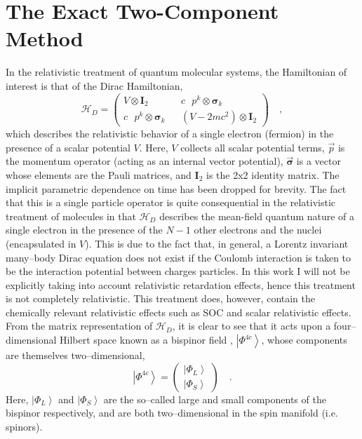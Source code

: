\documentclass[12pt]{article}
\newcommand{\ket}[1]{\left\vert #1 \right\rangle}         %
\newcommand*\vc[1]{\boldsymbol{#1}}
\newcommand*\op[1]{\mathcal{#1}}
\begin{document}
\section{The Exact Two-Component Method}
\label{sec:X2C}

In the relativistic treatment of quantum molecular systems, the Hamiltonian
of interest is that of the Dirac Hamiltonian,
\begin{equation}
\op{H}_D = 
\begin{pmatrix}
  V \otimes \vc{I}_2 && c \text { } p^k \otimes \vc{\sigma}_k \\
  c \text { } p^k \otimes \vc{\sigma}_k && (V - 2mc^2) \otimes \vc{I}_2
\end{pmatrix} \quad ,
\label{eq:DiracHam}
\end{equation}
which describes the relativistic behavior of a single electron (fermion) in the
presence of a scalar potential $V$. Here, $V$ collects all scalar potential
terms, $\vec{p}$ is the momentum operator (acting as an internal vector
potential), $\vec{\vc{\sigma}}$ is a vector whose elements are the Pauli
matrices, and $\vc{I}_2$ is the 2x2 identity matrix. The implicit parametric
dependence on time has been dropped for brevity. The fact that this is a single
particle operator is quite consequential in the relativistic treatment of
molecules in that $\op{H}_D$ describes the mean-field quantum nature of a
single electron in the presence of the $N-1$ other electrons and the nuclei
(encapsulated in $V$). This is due to the fact that, in general, a Lorentz
invariant many--body Dirac equation does not exist if the Coulomb interaction is
taken to be the interaction potential between charges particles. In this work I
will not be explicitly taking into account relativistic retardation effects,
hence this treatment is not completely relativistic. This treatment does,
however, contain the chemically relevant relativistic effects such as
SOC and  scalar relativistic effects.
From the matrix representation of $\op{H}_D$, it is clear to see that it
acts upon a four--dimensional Hilbert space known as a bispinor field ,
$\ket{\Phi^{4c}}$, whose components are themselves two--dimensional,
\begin{equation}
\ket{\Phi^{4c}} = \begin{pmatrix}
 \ket{\Phi_L} \\ \ket{\Phi_S}
\end{pmatrix} \quad.
\end{equation}
Here, $\ket{\Phi_L}$ and $\ket{\Phi_S}$ are the so--called large and small
components of the bispinor respectively, and are both two--dimensional in the
spin manifold (i.e. spinors).
\end{document}
